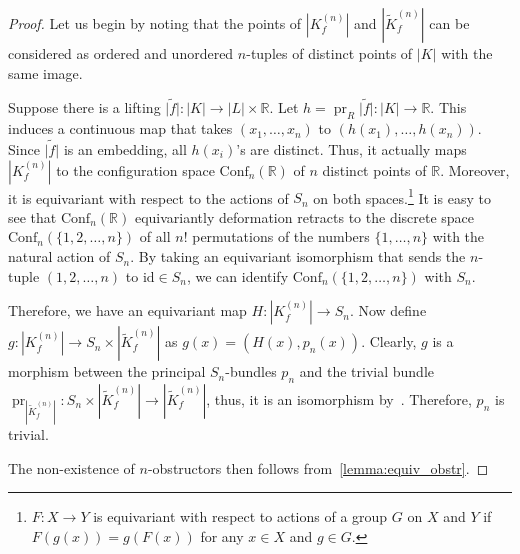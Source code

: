 \documentclass[a4paper,12pt,reqno,oneside]{amsart}
\theoremstyle{plain}
\theoremstyle{definition}
\theoremstyle{plain}
\newcommand{\from}{\colon}
\newcommand{\wt}[1]{\widetilde{#1}}
\newcommand{\Conf}{\mathrm{Conf}}
\newcommand{\id}{\mathrm{id}}
\newcommand{\R}{\mathbb{R}}
\DeclareMathOperator{\pr}{pr}
\begin{document}
\begin{proof}
  Let us begin by noting that the points of $|K^{(n)}_f|$ and $|\wt{K}^{(n)}_f|$ can be
  considered as ordered and unordered $n$-tuples of distinct points of $|K|$ with the same image.

  Suppose there is a lifting $\wt{|f|} \from |K| \to |L| \times \R$. Let
  $h = \pr_R \wt{|f|} \from |K| \to \R$. This induces a continuous map that takes $(x_1, \dots, x_n)$
  to $(h(x_1), \dots, h(x_n))$. Since $\wt{|f|}$ is an embedding, all $h(x_i)$'s are distinct. Thus,
  it actually maps $|K^{(n)}_f|$ to the configuration space $\Conf_n(\R)$ of $n$ distinct points of
  $\R$. Moreover, it is equivariant with respect to the actions of $S_n$ on both
  spaces.\footnote{$F \from X \to Y$ is equivariant with respect to actions of a group $G$ on $X$
    and $Y$ if $F(g(x)) = g(F(x))$ for any $x \in X$ and $g \in G$.} It is easy to see that $\Conf_n(\R)$
  equivariantly deformation retracts to the discrete space $\Conf_{n}(\{1, 2, \dots, n\})$ of all $n!$ permutations of the
  numbers $\{1, \dots, n\}$ with the natural action of $S_n$. By taking an equivariant isomorphism
  that sends the $n$-tuple $(1, 2, \dots, n)$ to $\id \in S_{n}$, we can identify $\Conf_{n}(\{1, 2, \dots, n\})$ with $S_n$.

  Therefore, we have an equivariant map $H \from |K^{(n)}_f| \to S_n$. Now define
  $g \from |K^{(n)}_f| \to S_n \times |\wt{K}^{(n)}_f|$ as $g(x) = (H(x), p_n(x))$. Clearly, $g$ is
  a morphism between the principal $S_n$-bundles $p_n$ and the trivial bundle
  $\pr_{|\wt{K}^{(n)}_f|} \from S_n \times |\wt{K}^{(n)}_f| \to |\wt{K}^{(n)}_f|$, thus, it is an
  isomorphism by~\cite[Proposition 2.1]{principal_bundles}. Therefore, $p_n$ is trivial.

  The non-existence of $n$-obstructors then follows from~\cref{lemma:equiv_obstr}.
\end{proof}
\end{document}
